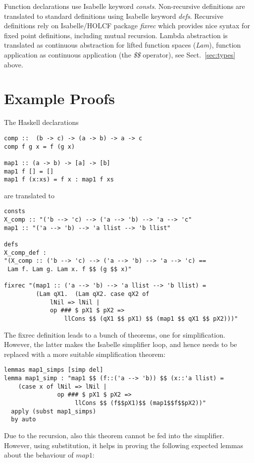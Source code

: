 \documentclass{llncs}
\begin{document}
Function declarations use Isabelle keyword \emph{consts}. 
%
Non-recursive definitions are translated to standard definitions using
Isabelle keyword \emph{defs}. Recursive definitions rely on
Isabelle/HOLCF package \emph{fixrec} which provides nice syntax for
fixed point definitions, including mutual recursion. Lambda
abstraction is translated as continuous abstraction for lifted
function spaces (\emph{Lam}), function application as continuous
application (the \emph{\$\$} operator), see Sect.~\ref{sec:types}
above.

\section{Example Proofs}
\label{sec:ex}

The Haskell declarations
\begin{verbatim}
comp ::  (b -> c) -> (a -> b) -> a -> c
comp f g x = f (g x)

map1 :: (a -> b) -> [a] -> [b]
map1 f [] = []
map1 f (x:xs) = f x : map1 f xs
\end{verbatim}

\noindent 
are translated to

\begin{verbatim}
consts
X_comp :: "('b --> 'c) --> ('a --> 'b) --> 'a --> 'c"
map1 :: "('a --> 'b) --> 'a llist --> 'b llist"

defs
X_comp_def :
"(X_comp :: ('b --> 'c) --> ('a --> 'b) --> 'a --> 'c) ==
 Lam f. Lam g. Lam x. f $$ (g $$ x)"

fixrec "(map1 :: ('a --> 'b) --> 'a llist --> 'b llist) =
         (Lam qX1.  (Lam qX2. case qX2 of
             lNil => lNil |
             op ### $ pX1 $ pX2 =>
                 llCons $$ (qX1 $$ pX1) $$ (map1 $$ qX1 $$ pX2)))"
\end{verbatim}


\noindent 
The fixrec definition leads to a bunch of theorems, one for simplification.
However, the latter makes the Isabelle simplifier loop, and hence needs
to be replaced with a more suitable simplification theorem:
\begin{verbatim}
lemmas map1_simps [simp del]
lemma map1_simp : "map1 $$ (f::('a --> 'b)) $$ (x::'a llist) =
    (case x of lNil => lNil | 
               op ### $ pX1 $ pX2 => 
                    llCons $$ (f$$pX1)$$ (map1$$f$$pX2))"
  apply (subst map1_simps)
  by auto
\end{verbatim}

\noindent 
Due to the recursion, also this theorem cannot be fed into the simplifier.
However, using substitution, it helps in proving the following
expected lemmas about the behaviour of $map1$:
\end{document}
